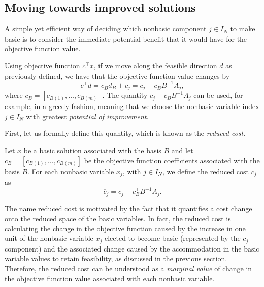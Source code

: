 \subsection{Moving towards improved solutions}

A simple yet efficient way of deciding which nonbasic component $j \in I_N$ to make basic is to consider the immediate potential benefit that it would have for the objective function value. 

Using objective function $c^\top x$, if we move along the feasible direction $d$ as previously defined, we have that the objective function value changes by 
%
\begin{equation*}
	c^\top d = c_B^\top d_B + c_j = c_j - c_B^\top B^{-1}A_j,
\end{equation*}
%
where $c_B = [c_{B(1)}, \dots, c_{B(m)}]$. The quantity $c_j - c_BB^{-1}A_j$ can be used, for example, in a greedy fashion, meaning that we choose the nonbasic variable index $j \in I_N$ with greatest \emph{potential of improvement}.

First, let us formally define this quantity, which is known as the \emph{reduced cost}. 

\begin{definition}
	Let $x$ be a basic solution associated with the basis $B$ and let $c_B = [c_{B(1)}, \dots, c_{B(m)}]$ be the objective function coefficients associated with the basis $B$. For each nonbasic variable $x_j$, with $j \in I_N$, we define the reduced cost $\overline{c}_j$ as
	\begin{equation*}
		\overline{c}_j = c_j - c_B^\top B^{-1}A_j.
	\end{equation*}
\end{definition}

The name reduced cost is motivated by the fact that it quantifies a cost change onto the reduced space of the basic variables. In fact, the reduced cost is calculating the change in the objective function caused by the increase in one unit of the nonbasic variable $x_j$ elected to become basic (represented by the $c_j$ component) and the associated change caused by the accommodation in the basic variable values to retain feasibility, as discussed in the previous section. Therefore, the reduced cost can be understood as a \emph{marginal value} of change in the objective function value associated with each nonbasic variable.

